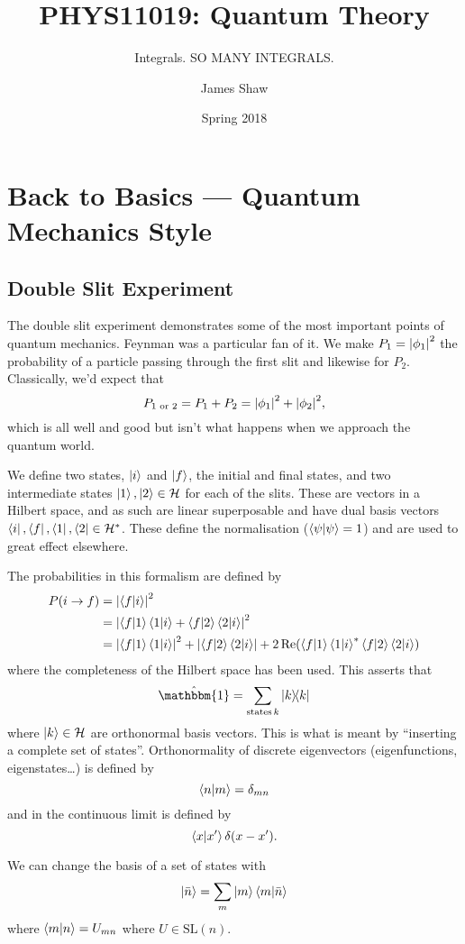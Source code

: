 \documentclass[]{revision-notes}
\title{PHYS11019: Quantum Theory}
\subtitle{Integrals. SO MANY INTEGRALS.}
\author{James Shaw}
\date{Spring 2018}
\begin{document}


\tableofcontents %

\chapter{Back to Basics --- Quantum Mechanics Style}
\section{Double Slit Experiment}

The double slit experiment demonstrates some of the most important points of quantum mechanics.
Feynman was a particular fan of it. We make $P_1 = \abs{\phi_1}^2$ the probability of a particle passing through the first slit and likewise for $P_2$.
Classically, we'd expect that $$P_{1\text{ or }2} = P_1 + P_2 = \abs{\phi_1}^2 + \abs{\phi_2}^2,$$ which is all well and good but isn't what happens when we approach the quantum world.

We define two states, $\ket{i}$ and $\ket{f}$, the initial and final states, and two intermediate states $\ket{1}, \ket{2} \in \mathcal{H}$ for each of the slits.
These are vectors in a Hilbert space, and as such are linear superposable and have dual basis vectors $\bra{i}, \bra{f}, \bra{1}, \bra{2} \in \mathcal{H}^\ast$.
These define the normalisation ($\braket{\psi} = 1$) and are used to great effect elsewhere.

The probabilities in this formalism are defined by
\begin{align*}
  P(i \to f) &= \abs{\bra{f}\ket{i}}^2\\
   &= \abs{\bra{f}\ket{1}\bra{1}\ket{i} + \bra{f}\ket{2}\bra{2}\ket{i}}^2\\
  &= \abs{\bra{f}\ket{1}\bra{1}\ket{i}}^2 + \abs{\bra{f}\ket{2}\bra{2}\ket{i}} + 2 \Re(\bra{f}\ket{1}\bra{1}\ket{i}^\ast \bra{f}\ket{2}\bra{2}\ket{i})
\end{align*}
where the completeness of the Hilbert space has been used.
This asserts that \[ \hat{\mathbbm{1}} = \sum_{\text{states}\, k} \dyad{k}\] where \( \ket{k}\in\mathcal{H} \) are orthonormal basis vectors.
This is what is meant by ``inserting a complete set of states''.
Orthonormality of discrete eigenvectors (eigenfunctions, eigenstates\ldots) is defined by \[ \braket{n}{m} = \delta_{mn}\] and in the continuous limit is defined by \[\braket{x}{x^\prime} \delta(x-x^\prime).\]

We can change the basis of a set of states with \[\ket{\bar{n}} = \sum_{m} \ket{m}\braket{m}{\bar{n}} \] where \(\braket{m}{n} = U_{mn}\) where $U \in \mathrm{SL}(n)$.
\end{document}
